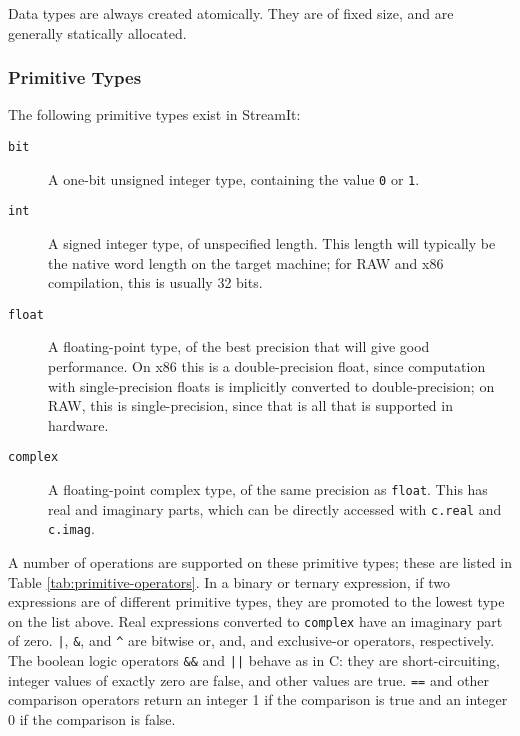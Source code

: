 \documentclass[11pt]{article}
\begin{document}
Data types are always created atomically.  They are of fixed size, and
are generally statically allocated.

\subsubsection{Primitive Types}

The following primitive types exist in StreamIt:

\begin{description}
\item[\lstinline|bit|]  A one-bit unsigned integer type, containing
  the value \lstinline|0| or \lstinline|1|.

\item[\lstinline|int|]  A signed integer type, of unspecified length.
  This length will typically be the native word length on the target
  machine; for RAW and x86 compilation, this is usually 32 bits.

\item[\lstinline|float|]  A floating-point type, of the best precision
  that will give good performance.  On x86 this is a double-precision
  float, since computation with single-precision floats is implicitly
  converted to double-precision; on RAW, this is single-precision,
  since that is all that is supported in hardware.

\item[\lstinline|complex|]  A floating-point complex type, of the same
  precision as \lstinline|float|.  This has real and imaginary parts,
  which can be directly accessed with \lstinline|c.real| and
  \lstinline|c.imag|.
\end{description}

\label{sec:operators}
A number of operations are supported on these primitive types; these
are listed in Table \ref{tab:primitive-operators}.  In a binary or
ternary expression, if two expressions are of different primitive
types, they are promoted to the lowest type on the list above.  Real
expressions converted to \lstinline|complex| have an imaginary part of
zero.  \lstinline/|/, \lstinline|&|, and \lstinline|^| are bitwise or,
and, and exclusive-or operators, respectively.  The boolean logic
operators \lstinline|&&| and \lstinline/||/ behave as in C: they are
short-circuiting, integer values of exactly zero are false, and other
values are true.  \lstinline|==| and other comparison operators return
an integer 1 if the comparison is true and an integer 0 if the
comparison is false.
\end{document}
